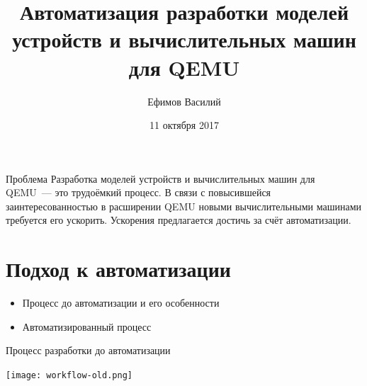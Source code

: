 \documentclass[unicode,hyperref={unicode=true}]{beamer}
\title[]
{Автоматизация разработки моделей устройств и вычислительных машин для QEMU}
\author[]{Ефимов Василий}
\institute[]{ИСП РАН}
\date[]{11 октября 2017}
\newcommand*{\sectionpagekb}{\usebeamertemplate*{section page kb}}
\theoremstyle{definition}
\theoremstyle{plain}
\begin{document}
\begin{frame}
\titlepage
\end{frame}



\begin{frame}{Проблема}
Разработка моделей устройств и вычислительных машин для QEMU~--- это трудоёмкий
процесс. В связи с повысившейся заинтересованностью в расширении QEMU новыми
вычислительными машинами требуется его ускорить. Ускорения предлагается достичь
за счёт автоматизации.
\end{frame}






\section{Подход к автоматизации}
\begin{frame}
\sectionpagekb
\begin{itemize}
\item Процесс до автоматизации и его особенности
\item Автоматизированный процесс
\end{itemize}
\end{frame}



\begin{frame}{Процесс разработки до автоматизации}
\begin{center}
\texttt{[image: workflow-old.png]}
\end{center}
\end{frame}
\end{document}
